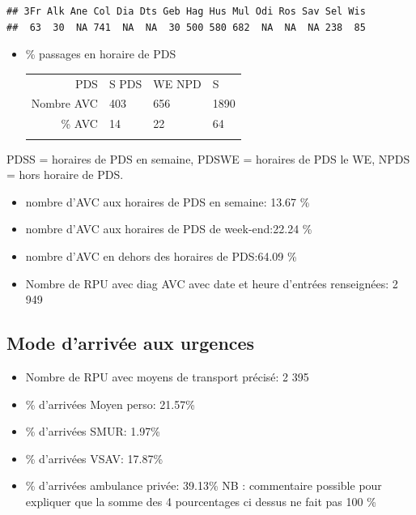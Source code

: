 \documentclass[]{article}
\begin{document}
\begin{verbatim}
## 3Fr Alk Ane Col Dia Dts Geb Hag Hus Mul Odi Ros Sav Sel Wis 
##  63  30  NA 741  NA  NA  30 500 580 682  NA  NA  NA 238  85
\end{verbatim}

\begin{itemize}
\item
  \% passages en horaire de PDS

  \begin{longtable}[c]{@{}rlll@{}}
  \toprule\addlinespace
  PDS & S PDS & WE NPD & S
  \\\addlinespace
  \midrule\endhead
  Nombre AVC & 403 & 656 & 1890
  \\\addlinespace
  \% AVC & 14 & 22 & 64
  \\\addlinespace
  \bottomrule
  \end{longtable}
\end{itemize}

PDSS = horaires de PDS en semaine, PDSWE = horaires de PDS le WE, NPDS =
hors horaire de PDS.

\begin{itemize}
\itemsep1pt\parskip0pt
\item
  nombre d'AVC aux horaires de PDS en semaine: 13.67 \%
\item
  nombre d'AVC aux horaires de PDS de week-end:22.24 \%
\item
  nombre d'AVC en dehors des horaires de PDS:64.09 \%
\item
  Nombre de RPU avec diag AVC avec date et heure d'entrées renseignées:
  2 949
\end{itemize}

\subsection{Mode d'arrivée aux
urgences}\label{mode-darrivee-aux-urgences}

\begin{itemize}
\itemsep1pt\parskip0pt
\item
  Nombre de RPU avec moyens de transport précisé: 2 395
\item
  \% d'arrivées Moyen perso: 21.57\%
\item
  \% d'arrivées SMUR: 1.97\%
\item
  \% d'arrivées VSAV: 17.87\%
\item
  \% d'arrivées ambulance privée: 39.13\% NB : commentaire possible pour
  expliquer que la somme des 4 pourcentages ci dessus ne fait pas 100 \%
\end{itemize}
\end{document}
